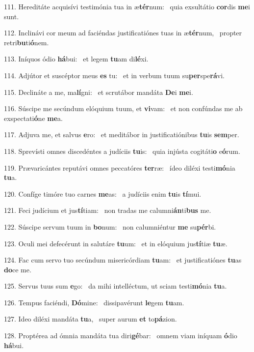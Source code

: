 111. Hereditáte acquisívi testimónia tua in æ\textbf{tér}num: \ast\  quia exsultátio \textbf{cor}dis \textbf{me}i sunt.\

112. Inclinávi cor meum ad faciéndas justificatiónes tuas in æ\textbf{tér}num, \ast\  propter retri\textbf{bu}ti\textbf{ó}nem.\

113. Iníquos ódio \textbf{há}bui: \ast\  et legem \textbf{tu}am di\textbf{lé}xi.\

114. Adjútor et suscéptor meus \textbf{es} tu: \ast\  et in verbum tuum su\textbf{per}spe\textbf{rá}vi.\

115. Declináte a me, ma\textbf{lí}gni: \ast\  et scrutábor mandáta \textbf{De}i \textbf{me}i.\

116. Súscipe me secúndum elóquium tuum, et \textbf{vi}vam: \ast\  et non confúndas me ab exspectati\textbf{ó}ne \textbf{me}a.\

117. Adjuva me, et salvus \textbf{e}ro: \ast\  et meditábor in justificatiónibus \textbf{tu}is \textbf{sem}per.\

118. Sprevísti omnes discedéntes a judíciis \textbf{tu}is: \ast\  quia injústa cogitáti\textbf{o} e\textbf{ó}rum.\

119. Prævaricántes reputávi omnes peccatóres \textbf{ter}ræ: \ast\  ídeo diléxi testi\textbf{mó}nia \textbf{tu}a.\

120. Confíge timóre tuo carnes \textbf{me}as: \ast\  a judíciis enim \textbf{tu}is \textbf{tí}mui.\

121. Feci judícium et jus\textbf{tí}tiam: \ast\  non tradas me calumni\textbf{án}ti\textbf{bus} me.\

122. Súscipe servum tuum in \textbf{bo}num: \ast\  non calumniéntur \textbf{me} su\textbf{pér}bi.\

123. Oculi mei defecérunt in salutáre \textbf{tu}um: \ast\  et in elóquium jus\textbf{tí}tiæ \textbf{tu}æ.\

124. Fac cum servo tuo secúndum misericórdiam \textbf{tu}am: \ast\  et justificatiónes \textbf{tu}as \textbf{do}ce me.\

125. Servus tuus sum \textbf{e}go: \ast\  da mihi intelléctum, ut sciam testi\textbf{mó}nia \textbf{tu}a.\

126. Tempus faciéndi, \textbf{Dó}mine: \ast\  dissipavérunt \textbf{le}gem \textbf{tu}am.\

127. Ideo diléxi mandáta \textbf{tu}a, \ast\  super aurum \textbf{et} to\textbf{pá}zion.\

128. Proptérea ad ómnia mandáta tua diri\textbf{gé}bar: \ast\  omnem viam iníquam \textbf{ó}dio \textbf{há}bui.\

